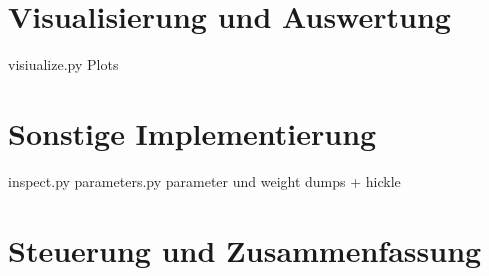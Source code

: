 \section{Visualisierung und Auswertung}
\label{sec:imp_vis}
	visiualize.py
	Plots

\section{Sonstige Implementierung}
\label{sec:imp_vis}
	inspect.py
	parameters.py
	parameter und weight dumps + hickle

\section{Steuerung und Zusammenfassung}
\label{sec:imp_zusammenfassung}


